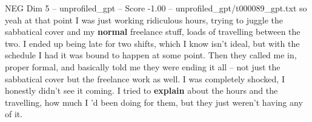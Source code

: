 \begin{textsample}{NEG Dim 5 – unprofiled\_gpt – Score -1.00 – unprofiled\_gpt/t000089\_gpt.txt}  \label{ex:f5_neg_016}
so yeah at that point I was just working ridiculous hours, trying to juggle the sabbatical cover and my \textbf{normal} freelance stuff, loads of travelling between the two.
I ended up being late for two shifts, which I know isn't ideal, but with the schedule I had it was bound to happen at some point.
Then they called me in, proper formal, and basically told me they were ending it all – not just the sabbatical cover but the freelance work as well.
I was completely shocked, I honestly didn't see it coming.
I tried to \textbf{explain} about the hours and the travelling, how much I ’d been doing for them, but they just weren't having any of it.

\end{textsample}
